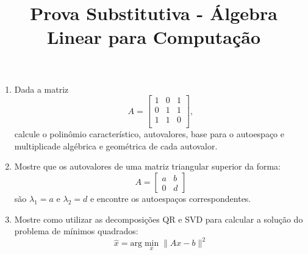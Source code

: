 \documentclass[a4paper,12pt]{article}
\title{Prova Substitutiva - Álgebra Linear para Computação}
\date{}
\begin{document}
\maketitle
\vspace{-4em}
\begin{enumerate}
    \item Dada a matriz 
    $$A = \begin{bmatrix}
        1 & 0 & 1\\
        0 & 1 & 1\\
        1 & 1 & 0\\
    \end{bmatrix},$$
     calcule o polinômio característico, autovalores, base para o autoespaço e multiplicade algébrica e geométrica de cada autovalor.

    \item Mostre que os autovalores de uma matriz triangular superior da forma:
    $$
    A = \begin{bmatrix}
        a & b\\
        0 & d
    \end{bmatrix}
    $$
    são $\lambda_1 = a$ e $\lambda_2 = d$ e encontre os autoespaços correspondentes.

    \item Mostre como utilizar as decomposições QR e SVD para calcular a solução do problema de mínimos quadrados:
    $$
    \hat{x} = \text{arg}\min_x \|Ax - b \|^2
    $$

\end{enumerate}
\end{document}
